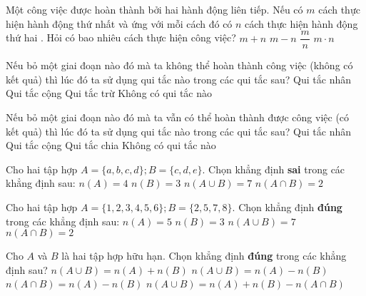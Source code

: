 \begin{ex}%
	Một công việc được hoàn thành bởi hai hành động liên tiếp. Nếu có $ m $ cách thực hiện hành động thứ nhất và ứng với mỗi cách đó có $ n $ cách thực hiện hành động thứ hai . Hỏi có bao nhiêu cách thực hiện công việc?
	\choice
	{$ m+n $}
	{$ m-n $}
	{$ \dfrac{m}{n}$}
	{\True $ m\cdot n $}
\end{ex}
\begin{ex} %
	Nếu bỏ một giai đoạn nào đó mà ta không thể hoàn thành công việc (không có kết quả) thì lúc đó ta sử dụng qui tắc nào trong các qui tắc sau?
	\choice
	{\True Qui tắc nhân}
	{Qui tắc cộng}
	{Qui tắc trừ}
	{Không có qui tắc nào}
\end{ex}
\begin{ex}%
	Nếu bỏ một giai đoạn nào đó mà ta vẫn có thể hoàn thành được công việc (có kết quả) thì lúc đó ta sử dụng qui tắc nào trong các qui tắc sau?
	\choice
	{ Qui tắc nhân}
	{\True Qui tắc cộng}
	{Qui tắc chia}
	{Không có qui tắc nào}
\end{ex}
\begin{ex}%
	Cho hai tập hợp $A  = \{a,b,c,d\}; B  =\{c,d,e\}$. Chọn khẳng định \textbf{sai} trong các khẳng định sau:
	\choice
	{$ n(A)=4 $}
	{$ n(B)=3 $}
	{\True $ n(A \cup B) =7 $}
	{$ n(A \cap B)=2 $}
\end{ex}
\begin{ex}%
	Cho hai tập hợp $A  = \{1,2,3,4,5,6 \}; B  =\{2,5,7,8 \}$. Chọn khẳng định \textbf{đúng} trong các khẳng định sau:
	\choice
	{$ n(A)= 5$}
	{$ n(B)=3 $}
	{ $ n(A \cup B) =7 $}
	{\True $ n(A \cap B)=2 $}
\end{ex}
\begin{ex}%
	Cho $ A $ và $ B $ là hai tập hợp hữu hạn. Chọn khẳng định \textbf{đúng} trong các khẳng định sau?
	\choice
	{$ n(A\cup B)= n(A)+n(B) $}
	{$ n(A\cup B)= n(A)-n(B) $}
	{$ n(A\cap B)= n(A)-n(B) $}
	{\True $ n(A \cup B)= n(A)+n(B) - n(A \cap B) $}
\end{ex}

